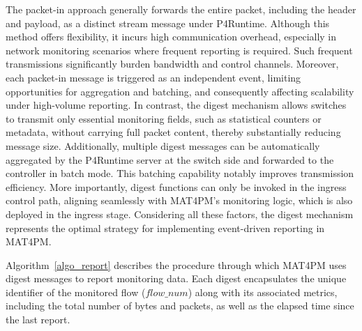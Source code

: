 The packet-in approach generally forwards the entire packet, including the header and payload, as a distinct stream message under P4Runtime. 
Although this method offers flexibility, it incurs high communication overhead, especially in network monitoring scenarios where frequent reporting is required. 
Such frequent transmissions significantly burden bandwidth and control channels. 
Moreover, each packet-in message is triggered as an independent event, limiting opportunities for aggregation and batching, and consequently affecting scalability under high-volume reporting. 
In contrast, the digest mechanism allows switches to transmit only essential monitoring fields, such as statistical counters or metadata, without carrying full packet content, thereby substantially reducing message size. 
Additionally, multiple digest messages can be automatically aggregated by the P4Runtime server at the switch side and forwarded to the controller in batch mode. 
This batching capability notably improves transmission efficiency. 
More importantly, digest functions can only be invoked in the ingress control path, aligning seamlessly with MAT4PM's monitoring logic, which is also deployed in the ingress stage. 
Considering all these factors, the digest mechanism represents the optimal strategy for implementing event-driven reporting in MAT4PM.

Algorithm~\ref{algo_report} describes the procedure through which MAT4PM uses digest messages to report monitoring data. 
Each digest encapsulates the unique identifier of the monitored flow ($flow\_num$) along with its associated metrics, including the total number of bytes and packets, as well as the elapsed time since the last report.

